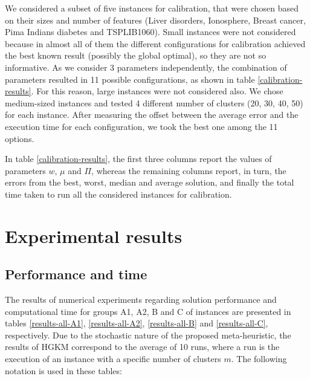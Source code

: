 We considered a subset of five instances for calibration, that were chosen based on their sizes and number of features (Liver disorders, Ionosphere, Breast cancer, Pima Indians diabetes and TSPLIB1060). Small instances were not considered because in almost all of them the different configurations for calibration achieved the best known result (possibly the global optimal), so they are not so informative. As we consider 3 parameters independently, the combination of parameters resulted in 11 possible configurations, as shown in table \ref{calibration-results}. For this reason, large instances were not considered also.
We chose medium-sized instances and tested 4 different number of clusters (20, 30, 40, 50) for each instance. After measuring the offset between the average error and the execution time for each configuration, we took the best one among the 11 options.

In table \ref{calibration-results}, the first three columns report the values of parameters $w$, $\mu$ and $\Pi$, whereas the remaining columns report, in turn, the errors from the best, worst, median and average solution, and finally the total time taken to run all the considered instances for calibration.



\section{Experimental results}
\label{sec:results}

\subsection{Performance and time}
\label{sec:performance}
The results of numerical experiments regarding solution performance and computational time for groups A1, A2, B and C of instances are presented in tables \ref{results-all-A1}, \ref{results-all-A2}, \ref{results-all-B} and \ref{results-all-C}, respectively. Due to the stochastic nature of the proposed meta-heuristic, the results of HGKM correspond to the average of 10 runs, where a run is the execution of an instance with a specific number of clusters $m$. The following notation is used in these tables:

